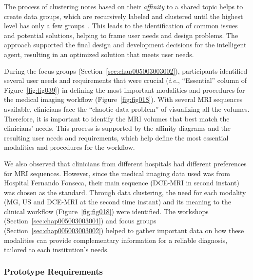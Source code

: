 \vspace{0.05mm}

The process of clustering notes based on their {\it affinity} to a shared topic helps to create data groups, which are recursively labeled and clustered until the highest level has only a few groups~\cite{harrington2016affinity, 10.1145/3290605.3300628, 10.1145/3173574.3173704}.
This leads to the identification of common issues and potential solutions, helping to frame user needs and design problems.
The approach supported the final design and development decisions for the intelligent agent, resulting in an optimized solution that meets user needs.

During the focus groups (Section~\ref{sec:chap005003003002}), participants identified several user needs and requirements that were crucial ({\it i.e.}, ``Essential'' column of Figure~\ref{fig:fig039}) in defining the most important modalities and procedures for the medical imaging workflow (Figure~\ref{fig:fig018}).
With several \ac{MRI} sequences available, clinicians face the ``chaotic data problem'' of visualizing all the volumes.
Therefore, it is important to identify the \ac{MRI} volumes that best match the clinicians' needs.
This process is supported by the affinity diagrams and the resulting user needs and requirements, which help define the most essential modalities and procedures for the workflow.

We also observed that clinicians from different hospitals had different preferences for \ac{MRI} sequences.
However, since the medical imaging data used was from Hospital Fernando Fonseca, their main sequence (\ac{DCE}-\ac{MRI} in second instant) was chosen as the standard.
Through data clustering, the need for each modality (\ac{MG}, \ac{US} and \ac{DCE}-\ac{MRI} at the second time instant) and its meaning to the clinical workflow (Figure~\ref{fig:fig018}) were identified.
The workshops (Section~\ref{sec:chap005003003001}) and focus groups (Section~\ref{sec:chap005003003002}) helped to gather important data on how these modalities can provide complementary information for a reliable diagnosis, tailored to each institution's needs.

\subsubsection{Prototype Requirements}
\label{sec:chap005003003005}

